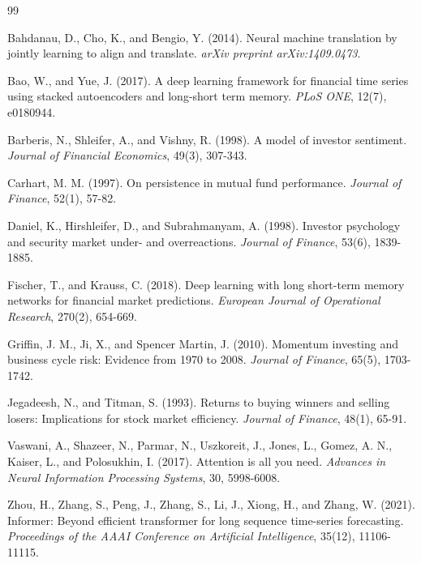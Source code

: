 \documentclass[preprint,authoryear,12pt]{elsarticle}
\begin{document}
\begin{thebibliography}{99}

Bahdanau, D., Cho, K., and Bengio, Y. (2014). Neural machine translation by jointly learning to align and translate. \textit{arXiv preprint arXiv:1409.0473}.

Bao, W., and Yue, J. (2017). A deep learning framework for financial time series using stacked autoencoders and long-short term memory. \textit{PLoS ONE}, 12(7), e0180944.

Barberis, N., Shleifer, A., and Vishny, R. (1998). A model of investor sentiment. \textit{Journal of Financial Economics}, 49(3), 307-343.

Carhart, M. M. (1997). On persistence in mutual fund performance. \textit{Journal of Finance}, 52(1), 57-82.

Daniel, K., Hirshleifer, D., and Subrahmanyam, A. (1998). Investor psychology and security market under- and overreactions. \textit{Journal of Finance}, 53(6), 1839-1885.

Fischer, T., and Krauss, C. (2018). Deep learning with long short-term memory networks for financial market predictions. \textit{European Journal of Operational Research}, 270(2), 654-669.

Griffin, J. M., Ji, X., and Spencer Martin, J. (2010). Momentum investing and business cycle risk: Evidence from 1970 to 2008. \textit{Journal of Finance}, 65(5), 1703-1742.

Jegadeesh, N., and Titman, S. (1993). Returns to buying winners and selling losers: Implications for stock market efficiency. \textit{Journal of Finance}, 48(1), 65-91.

Vaswani, A., Shazeer, N., Parmar, N., Uszkoreit, J., Jones, L., Gomez, A. N., Kaiser, L., and Polosukhin, I. (2017). Attention is all you need. \textit{Advances in Neural Information Processing Systems}, 30, 5998-6008.

Zhou, H., Zhang, S., Peng, J., Zhang, S., Li, J., Xiong, H., and Zhang, W. (2021). Informer: Beyond efficient transformer for long sequence time-series forecasting. \textit{Proceedings of the AAAI Conference on Artificial Intelligence}, 35(12), 11106-11115.

\end{thebibliography}
\end{document}
